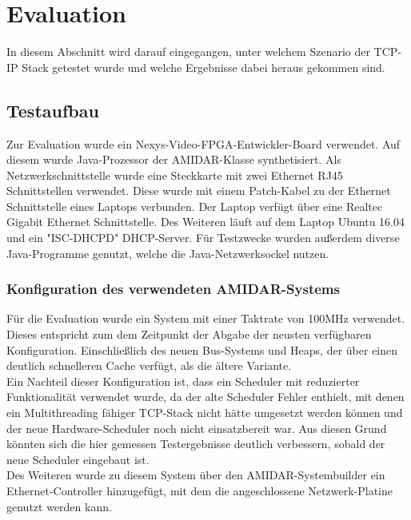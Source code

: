 \chapter{Evaluation}
In diesem Abschnitt wird darauf eingegangen, unter welchem Szenario der TCP-IP Stack getestet wurde und welche Ergebnisse dabei heraus gekommen sind.
\section{Testaufbau}

Zur Evaluation wurde ein Nexys-Video-FPGA-Entwickler-Board verwendet. Auf diesem wurde Java-Prozessor der AMIDAR-Klasse synthetisiert. Als Netzwerkschnittstelle wurde eine Steckkarte mit zwei Ethernet RJ45 Schnittstellen verwendet. Diese wurde mit einem Patch-Kabel zu der Ethernet Schnittstelle eines Laptops verbunden. Der Laptop verfügt über eine Realtec Gigabit Ethernet Schnittstelle. Des Weiteren läuft auf dem Laptop Ubuntu 16.04 und ein "{}ISC-DHCPD"{} DHCP-Server. Für Testzwecke wurden außerdem diverse Java-Programme genutzt, welche die Java-Netzwerksockel nutzen. 

\subsection{Konfiguration des verwendeten AMIDAR-Systems}
Für die Evaluation wurde ein System mit einer Taktrate von 100MHz verwendet. Dieses entspricht zum dem Zeitpunkt der Abgabe der neusten verfügbaren Konfiguration. Einschließlich des neuen Bus-Systems und Heaps, der über einen deutlich schnelleren Cache verfügt, als die ältere Variante. \\
Ein Nachteil dieser Konfiguration ist, dass ein Scheduler mit reduzierter Funktionalität verwendet wurde, da der alte Scheduler Fehler enthielt, mit denen ein Multithreading fähiger TCP-Stack nicht hätte umgesetzt werden können und der neue Hardware-Scheduler noch nicht einsatzbereit war. Aus diesen Grund könnten sich die hier gemessen Testergebnisse deutlich verbessern, sobald der neue Scheduler eingebaut ist. \\
Des Weiteren wurde zu diesem System über den AMIDAR-Systembuilder ein Ethernet-Controller hinzugefügt, mit dem die angeschlossene Netzwerk-Platine genutzt werden kann.


